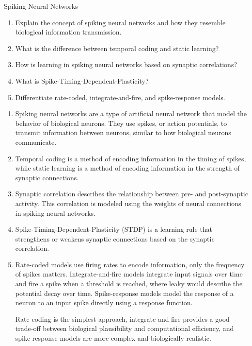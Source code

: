 \documentclass{article}
\author{Leopold Lemmermann}
\begin{document}
\createtitle


\begin{exercise}{Spiking Neural Networks}
  \begin{enumerate}
    \item Explain the concept of spiking neural networks and how they resemble biological information transmission.
    \item What is the difference between temporal coding and static learning?
    \item How is learning in spiking neural networks based on synaptic correlations?
    \item What is Spike-Timing-Dependent-Plasticity?
    \item Differentiate rate-coded, integrate-and-fire, and spike-response models.
  \end{enumerate}

  \begin{solution}
    \begin{enumerate}
      \item Spiking neural networks are a type of artificial neural network that model the behavior of biological neurons. They use spikes, or action potentials, to transmit information between neurons, similar to how biological neurons communicate.
      \item Temporal coding is a method of encoding information in the timing of spikes, while static learning is a method of encoding information in the strength of synaptic connections.
      \item Synaptic correlation describes the relationship between pre- and post-synaptic activity. This correlation is modeled using the weights of neural connections in spiking neural networks.
      \item Spike-Timing-Dependent-Plasticity (STDP) is a learning rule that strengthens or weakens synaptic connections based on the synaptic correlation.
      \item Rate-coded models use firing rates to encode information, only the frequency of spikes matters. Integrate-and-fire models integrate input signals over time and fire a spike when a threshold is reached, where leaky would describe the potential decay over time. Spike-response models model the response of a neuron to an input spike directly using a response function.
          \par Rate-coding is the simplest approach, integrate-and-fire provides a good trade-off between biological plausibility and computational efficiency, and spike-response models are more complex and biologically realistic.
    \end{enumerate}
  \end{solution}
\end{exercise}
\end{document}

